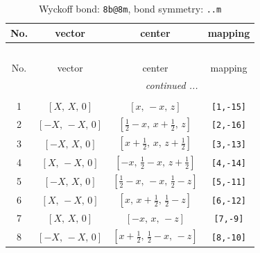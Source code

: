 \documentclass[fleqn,8pt]{jsarticle}
\begin{document}
\begin{longtable}{cccc}
\caption{Wyckoff bond: {\tt 8b@8m}, bond symmetry: {\tt ..m}}
 \\
 \hline \hline
No. & vector & center & mapping \\ \hline \endfirsthead

\multicolumn{3}{l}{\tablename\ \thetable{}} \\
 \hline \hline
No. & vector & center & mapping \\ \hline \endhead

 \hline \hline
\multicolumn{3}{r}{\footnotesize\it continued ...} \\ \endfoot

 \hline \hline
\multicolumn{3}{r}{} \\ \endlastfoot

1 & $\left[ X,\, X,\, 0 \right]$ & $\left[ x,\, - x,\, z \right]$ & {\tt [1,-15]} \\ \hline
2 & $\left[ - X,\, - X,\, 0 \right]$ & $\left[ \frac{1}{2} - x,\, x + \frac{1}{2},\, z \right]$ & {\tt [2,-16]} \\ \hline
3 & $\left[ - X,\, X,\, 0 \right]$ & $\left[ x + \frac{1}{2},\, x,\, z + \frac{1}{2} \right]$ & {\tt [3,-13]} \\ \hline
4 & $\left[ X,\, - X,\, 0 \right]$ & $\left[ - x,\, \frac{1}{2} - x,\, z + \frac{1}{2} \right]$ & {\tt [4,-14]} \\ \hline
5 & $\left[ - X,\, X,\, 0 \right]$ & $\left[ \frac{1}{2} - x,\, - x,\, \frac{1}{2} - z \right]$ & {\tt [5,-11]} \\ \hline
6 & $\left[ X,\, - X,\, 0 \right]$ & $\left[ x,\, x + \frac{1}{2},\, \frac{1}{2} - z \right]$ & {\tt [6,-12]} \\ \hline
7 & $\left[ X,\, X,\, 0 \right]$ & $\left[ - x,\, x,\, - z \right]$ & {\tt [7,-9]} \\ \hline
8 & $\left[ - X,\, - X,\, 0 \right]$ & $\left[ x + \frac{1}{2},\, \frac{1}{2} - x,\, - z \right]$ & {\tt [8,-10]} \\
\end{longtable}
\renewcommand{\arraystretch}{1.2}
\end{document}
